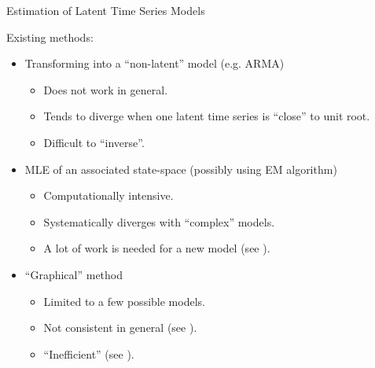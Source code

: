 \documentclass[envcountsect,usenames,dvipsnames]{beamer}
\theoremstyle{mystyle}
\begin{document}
\begin{frame}{Estimation of Latent Time Series Models}
	\begin{block}{Existing methods:}
		\begin{itemize}
			\item {\color{beamer@UIUCblue}Transforming into a ``non-latent'' model (e.g. ARMA)}
			\begin{itemize}
				\item Does not work in general.
				\item Tends to diverge when one latent time series is ``close'' to unit root.
				\item Difficult to ``inverse''.
			\end{itemize}
			\item {\color{beamer@UIUCblue}MLE of an associated state-space (possibly using EM algorithm)}
			\begin{itemize}
				\item Computationally intensive.
				\item Systematically diverges with ``complex'' models.
				\item A lot of work is needed for a new model (see \cite{stebler2011constrained}).
			\end{itemize}
			\item {\color{beamer@UIUCblue}``Graphical'' method}
			\begin{itemize}
				\item Limited to a few possible models.
				\item Not consistent in general (see \cite{guerrier2016theoretical}).
				\item ``Inefficient'' (see \cite{guerrier2016theoretical}).
			\end{itemize}
		\end{itemize}
	\end{block}
\end{frame}
\end{document}
